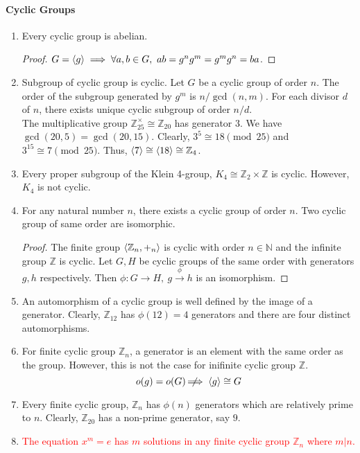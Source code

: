 \paragraph{Cyclic Groups}
\begin{enumerate}
	\item Every cyclic group is abelian.
	\begin{proof}
		$G = \left\langle g \right\rangle \implies \forall a,b \in G,\ ab = g^ng^m = g^mg^n = ba$.
	\end{proof}
	\item Subgroup of cyclic group is cyclic. Let $G$ be a cyclic group of order $n$. The order of the subgroup generated by $g^m$ is $n/\gcd(n,m)$. For each divisor $d$ of $n$, there exists unique cyclic subgroup of order $n/d$.\\

	The multiplicative group $\mathbb{Z}_{25}^\times \cong \mathbb{Z}_{20}$ has generator $3$.
	We have $\gcd(20,5) = \gcd(20,15)$.
	Clearly, $3^5 \cong 18 \pmod{25}$ and $3^{15} \cong 7 \pmod{25}$. Thus, $\left\langle 7 \right\rangle \cong \left\langle 18 \right\rangle \cong \mathbb{Z}_4$.
	\item Every proper subgroup of the Klein 4-group, $K_4 \cong \mathbb{Z}_2 \times \mathbb{Z}$ is cyclic. However, $K_4$ is not cyclic.
	\item For any natural number $n$, there exists a cyclic group of order $n$. Two cyclic group of same order are isomorphic.
	\begin{proof}
		The finite group $\left\langle \mathbb{Z}_n,+_n \right\rangle$ is cyclic with order $n \in \mathbb{N}$ and the infinite group $\mathbb{Z}$ is cyclic.
		Let $G,H$ be cyclic groups of the same order with generators $g,h$ respectively.
		Then $\phi : G \to H,\ g \overset{\phi}{\to} h$ is an isomorphism.
	\end{proof}
	\item An automorphism of a cyclic group is well defined by the image of a generator.
		Clearly, $\mathbb{Z}_{12}$ has $\phi(12)=4$ generators and there are four distinct automorphisms.
	\item For finite cyclic group $\mathbb{Z}_n$, a generator is an element with the same order as the group. However, this is not the case for inifinite cyclic group $\mathbb{Z}$.
		$$o(g) = o(G) \;\not\nobreak\!\!\!\!\implies \left\langle g \right\rangle \cong G$$
	\item Every finite cyclic group, $\mathbb{Z}_n$ has $\phi(n)$ generators which are relatively prime to $n$.
	Clearly, $\mathbb{Z}_{20}$ has a non-prime generator, say $9$.
	\item \textcolor{red}{The equation $x^m = e$ has $m$ solutions in any finite cyclic group $\mathbb{Z}_n$ where $m|n$.}

\end{enumerate}

